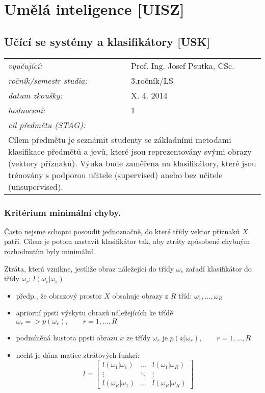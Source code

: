 \chapter{Umělá inteligence [UISZ]}

\section{Učící se systémy a klasifikátory [USK]}

\begin{table}[H]
\centering
\begin{tabular}{p{4cm} p{12cm}}
\textit{vyučující:}             & Prof. Ing. Josef Psutka, CSc. \\
\textit{ročník/semestr studia:} & 3.ročník/LS \\
\textit{datum zkoušky:}         & X. 4. 2014 \\
\textit{hodnocení:}             & 1 \\
\textit{cíl předmětu (STAG):}   & \\
\multicolumn{2}{p{16cm}}{Cílem předmětu je seznámit studenty se základními metodami klasifikace předmětů a jevů, které jsou reprezentovány svými obrazy (vektory příznaků). Výuka bude zaměřena na klasifikátory, které jsou trénovány s podporou učitele (supervised) anebo bez učitele (unsupervised).}
\end{tabular}
\end{table}

\subsection{Kritérium minimální chyby.}
Často nejsme schopni posoudit jednoznačně, do které třídy vektor příznaků $ X $ patří. Cílem je potom nastavit klasifikátor tak, aby ztráty způsobené chybným rozhodnutím byly minimální.

\begin{definition}
Ztráta, která vznikne, jestliže obraz náležející do třídy $ \omega_s $ zařadí klasifikátor do třídy $ \omega_r $: $ l(\omega_r | \omega_s) $
\end{definition}

\begin{itemize}
\item předp., že obrazový prostor $ X $ obsahuje obrazy z $ R $ tříd: $ \omega_1, ..., \omega_R $
\item apriorní ppsti výskytu obrazů náležejících ke třídě $ \omega_r => p(\omega_r), \qquad r = 1,...,R $
\item podmíněná hustota ppsti obrazu $ x $ ze třídy $ \omega_r $ je $ p(x | \omega_r), \qquad r = 1,...,R $
\item nechť je dána matice ztrátových funkcí:
\begin{equation}
l = \begin{bmatrix} l(\omega_1 | \omega_1) & \dots & l(\omega_1 | \omega_R) \\  
\vdots & \ddots & \vdots \\
l(\omega_R | \omega_1) & \dots & l(\omega_R | \omega_R) \end{bmatrix}
\end{equation}
\end{itemize}


